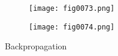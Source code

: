 %
%
%
%
%
%
%
%
%
%
\begin{figure}[H]
  \begin{subfigure}{0.49\textwidth}
  \texttt{[image: fig0073.png]}
  \label{fig0073}
  \end{subfigure}
  \begin{subfigure}{0.49\textwidth}
  \texttt{[image: fig0074.png]}
  \label{fig0074}
  \end{subfigure}
  \caption{Backpropagation}
\end{figure}


